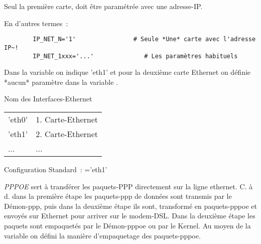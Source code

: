 Seul la première carte, doit être paramétrée avec une adresse-IP.

En d'autres termes~:

\begin{example}
\begin{verbatim}
        IP_NET_N='1'                # Seule *Une* carte avec l'adresse IP~!
        IP_NET_1xxx='...'              # Les paramètres habituels
\end{verbatim}
\end{example}

Dans la variable  on indique 'eth1' et pour la deuxième carte
Ethernet on définie *aucun* paramètre dans la variable .

\begin{description}
 


Nom des Interfaces-Ethernet

\begin{tabular}[h!]{ll}
  'eth0' & 1. Carte-Ethernet\\
  'eth1' & 2. Carte-Ethernet\\
  ...    &  ...\\
\end{tabular}

Configuration Standard~: ='eth1'


\emph{PPPOE} sert à transférer les paquets-PPP directement sur la ligne
ethernet. C. à d. dans la première étape les paquets-ppp de données sont
transmis par le Démon-ppp, puis dans la deuxième étape ils sont, transformé
en paquets-pppoe et envoyés sur Ethernet pour arriver sur le modem-DSL.
Dans la deuxième étape les paquets sont empaquetés par le Démon-pppoe ou par
le Kernel. Au moyen de la variable  on défini la manière
d'empaquetage des paquets-pppoe.


\end{description}
